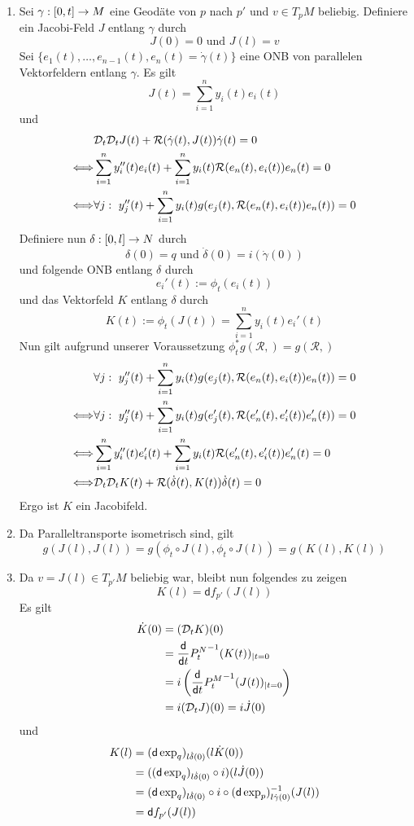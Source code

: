 \documentclass{book}
\renewcommand{\d}{\textsf{d}}
\newcommand{\Rc}{\mathcal{R}}
\begin{document}
\begin{Beweis}{}
\begin{enumerate}[1.)]
\item Sei $\gamma : [0,t] \overset{}{\rightarrow} M$ eine Geodäte von $p$ nach $p'$ und $v \in T_pM$ beliebig. Definiere ein Jacobi-Feld $J$ entlang $\gamma$ durch
\[ J(0) = 0 \text{ und } J(l) = v \]
Sei $\{e_1(t), \ldots, e_{n-1}(t), e_n(t) = \dot{\gamma}(t)\}$ eine ONB von parallelen Vektorfeldern entlang $\gamma$. Es gilt
\[ J(t) = \sum_{i = 1}^n y_i(t) e_i(t) \]
und
\begin{align*}
&\D_t\D_tJ(t) + \Rc( \dot{\gamma}(t), J(t)) \dot{\gamma}(t) = 0\\
\Gdw{} & \sum_{i = 1}^{n} y_i''(t) e_i(t) + \sum_{i = 1}^ny_i(t)\Rc (e_n(t), e_i(t) ) e_n(t) = 0\\
\Gdw{} &  \forall j:~ y_j''(t) + \sum_{i = 1}^ny_i(t)g(e_j(t), \Rc (e_n(t), e_i(t) ) e_n(t)) = 0 
\end{align*}
Definiere nun $\delta : [0,l] \overset{}{\rightarrow} N$ durch
\[ \delta(0) = q \text{ und } \dot{\delta}(0) = i(\dot{\gamma}(0)) \]
und folgende ONB entlang $\delta$ durch
\[ e_i'(t) := \phi_t(e_i(t)) \]
und das Vektorfeld $K$ entlang $\delta$ durch
\[ K(t) := \phi_t(J(t)) = \sum_{i = 1}^n y_i(t)e_i'(t) \]
Nun gilt aufgrund unserer Voraussetzung $\phi_t^*g(\Rc,) = g(\Rc,)$
\begin{align*}
&  \forall j:~ y_j''(t) + \sum_{i = 1}^ny_i(t)g(e_j(t), \Rc (e_n(t), e_i(t) ) e_n(t)) = 0 \\
\Gdw{} &  \forall j:~ y_j''(t) + \sum_{i = 1}^ny_i(t)g(e'_j(t), \Rc (e'_n(t), e'_i(t) ) e'_n(t)) = 0\\
\Gdw{} & \sum_{i = 1}^{n} y_i''(t) e'_i(t) + \sum_{i = 1}^ny_i(t)\Rc (e'_n(t), e'_i(t) ) e'_n(t) = 0\\
\Gdw{} &\D_t\D_tK(t) + \Rc( \dot{\delta}(t), K(t)) \dot{\delta}(t) = 0
\end{align*}
Ergo ist $K$ ein Jacobifeld.
\item Da Paralleltransporte isometrisch sind, gilt
\[ g(J(l), J(l)) = g(\phi_t\circ J(l),\phi_t\circ J(l)) = g(K(l), K(l)) \]
\item Da $v = J(l) \in T_{p'}M$ beliebig war, bleibt nun folgendes zu zeigen
\[ K(l) = \d f_{p'}(J(l)) \]
Es gilt
\begin{align*}
\dot{K}(0) &= (\D_tK)(0) \\
&= \frac{\d}{\d t} {P^N_t}\i(K(t))_{|t = 0}\\
&= i\klam{ \frac{\d}{\d t} {P^M_t}\i (J(t))_{|t = 0} }\\
&= i(\D_tJ)(0) = i\dot{J}(0) 
\end{align*}
und
\begin{align*}
K(l) &= (\d \exp_q)_{l\dot{\delta}(0)} (l\dot{K}(0))\\
&= ((\d\exp_q)_{l\dot{\delta}(0)}\circ i)(l\dot{J}(0))\\
&= (\d \exp_q)_{l\dot{\delta}(0)} \circ i \circ (\d \exp_p)\i_{l\dot{\gamma}(0)} (J(l))\\
&= \d f_{p'}(J(l))
\end{align*}
\end{enumerate}
\end{Beweis}
\end{document}
